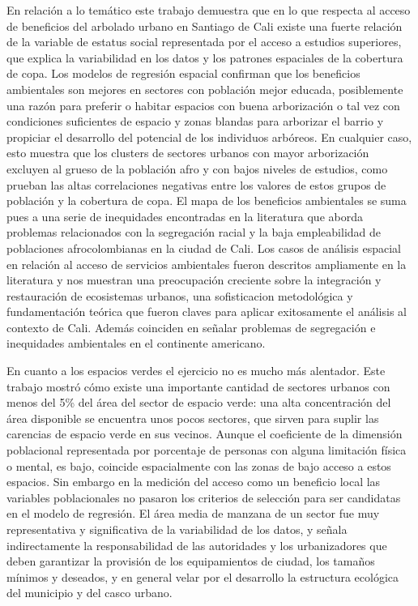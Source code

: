 \documentclass[12pt,]{book}
\begin{document}
En relación a lo temático este trabajo demuestra que en lo que respecta
al acceso de beneficios del arbolado urbano en Santiago de Cali existe
una fuerte relación de la variable de estatus social representada por el
acceso a estudios superiores, que explica la variabilidad en los datos y
los patrones espaciales de la cobertura de copa. Los modelos de
regresión espacial confirman que los beneficios ambientales son mejores
en sectores con población mejor educada, posiblemente una razón para
preferir o habitar espacios con buena arborización o tal vez con
condiciones suficientes de espacio y zonas blandas para arborizar el
barrio y propiciar el desarrollo del potencial de los individuos
arbóreos. En cualquier caso, esto muestra que los clusters de sectores
urbanos con mayor arborización excluyen al grueso de la población afro y
con bajos niveles de estudios, como prueban las altas correlaciones
negativas entre los valores de estos grupos de población y la cobertura
de copa. El mapa de los beneficios ambientales se suma pues a una serie
de inequidades encontradas en la literatura que aborda problemas
relacionados con la segregación racial y la baja empleabilidad de
poblaciones afrocolombianas en la ciudad de Cali. Los casos de análisis
espacial en relación al acceso de servicios ambientales fueron descritos
ampliamente en la literatura y nos muestran una preocupación creciente
sobre la integración y restauración de ecosistemas urbanos, una
sofisticacion metodológica y fundamentación teórica que fueron claves
para aplicar exitosamente el análisis al contexto de Cali. Además
coinciden en señalar problemas de segregación e inequidades ambientales
en el continente americano.

En cuanto a los espacios verdes el ejercicio no es mucho más alentador.
Este trabajo mostró cómo existe una importante cantidad de sectores
urbanos con menos del 5\% del área del sector de espacio verde: una alta
concentración del área disponible se encuentra unos pocos sectores, que
sirven para suplir las carencias de espacio verde en sus vecinos. Aunque
el coeficiente de la dimensión poblacional representada por porcentaje
de personas con alguna limitación física o mental, es bajo, coincide
espacialmente con las zonas de bajo acceso a estos espacios. Sin embargo
en la medición del acceso como un beneficio local las variables
poblacionales no pasaron los criterios de selección para ser candidatas
en el modelo de regresión. El área media de manzana de un sector fue muy
representativa y significativa de la variabilidad de los datos, y señala
indirectamente la responsabilidad de las autoridades y los urbanizadores
que deben garantizar la provisión de los equipamientos de ciudad, los
tamaños mínimos y deseados, y en general velar por el desarrollo la
estructura ecológica del municipio y del casco urbano.
\end{document}
